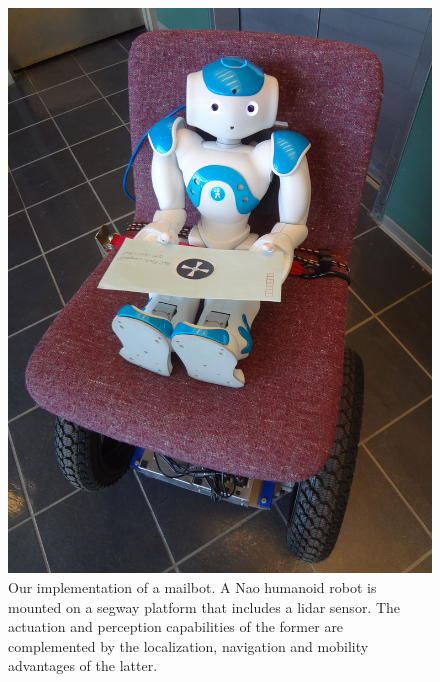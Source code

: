 \begin{figure}[t]
	\centering
	\includegraphics[width=0.7\columnwidth, clip]{./img/mailbot.jpg}
	\caption{Our implementation of a mailbot. A Nao humanoid robot is mounted on a segway platform that includes a lidar sensor. The actuation and perception capabilities of the former are complemented by the localization, navigation and mobility advantages of the latter.}
	\label{Fig:mailbot}
\end{figure}

